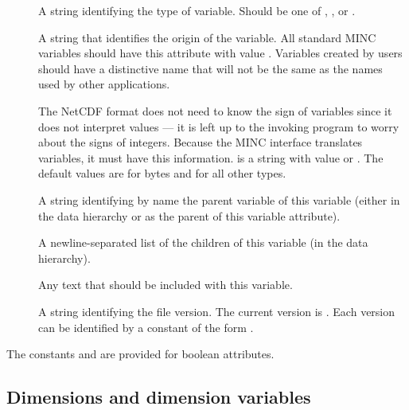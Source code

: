 \begin{description}
   \item [] A string identifying the type of variable.
      Should be one of , ,
       or .
   \item [] A string that identifies the origin of the
      variable. All standard MINC variables should have this attribute
      with value . Variables created by users should have a
      distinctive name that will not be the same as the names used by
      other applications.
   \item [] The NetCDF format does not need to know
      the sign of variables since it does not interpret values --- it
      is left up to the invoking program to worry about the signs of
      integers. Because the MINC interface translates variables, it
      must have this information.  is a string with
      value  or . The default values are
       for bytes and  for all other types.
   \item [] A string identifying by name the parent
      variable of this variable (either in the data hierarchy or as
      the parent of this variable attribute).
   \item [] A newline-separated list of the children
      of this variable (in the data hierarchy).
   \item [] Any text that should be included with
      this variable.
   \item [] A string identifying the file version. The
      current version is . Each version can be
      identified by a constant of the form .
\end{description}

The constants  and  are provided for
boolean attributes. 

\subsection{Dimensions and dimension variables}

